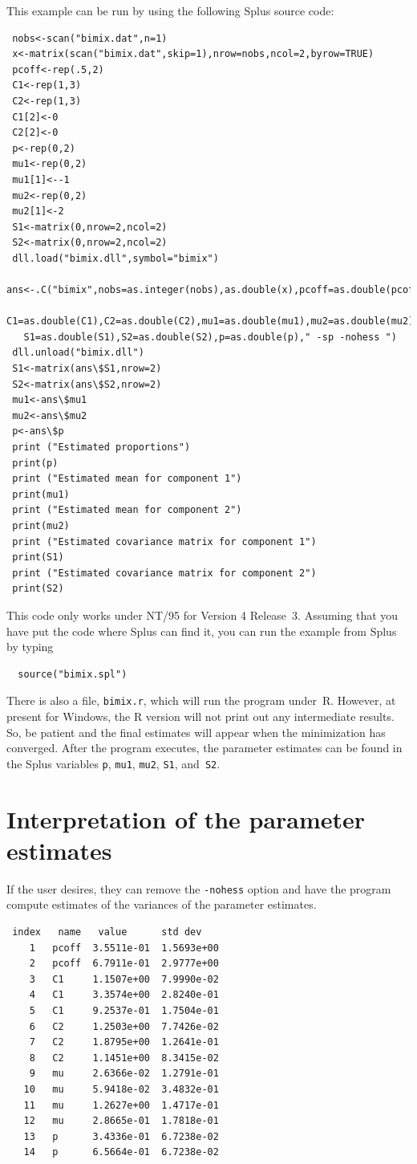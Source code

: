 This example can be run by using the following Splus source code:
\begin{lstlisting}
 nobs<-scan("bimix.dat",n=1)
 x<-matrix(scan("bimix.dat",skip=1),nrow=nobs,ncol=2,byrow=TRUE)
 pcoff<-rep(.5,2)
 C1<-rep(1,3)
 C2<-rep(1,3)
 C1[2]<-0
 C2[2]<-0
 p<-rep(0,2)
 mu1<-rep(0,2)
 mu1[1]<--1
 mu2<-rep(0,2)
 mu2[1]<-2
 S1<-matrix(0,nrow=2,ncol=2)
 S2<-matrix(0,nrow=2,ncol=2)
 dll.load("bimix.dll",symbol="bimix")
 ans<-.C("bimix",nobs=as.integer(nobs),as.double(x),pcoff=as.double(pcoff),
   C1=as.double(C1),C2=as.double(C2),mu1=as.double(mu1),mu2=as.double(mu2),
   S1=as.double(S1),S2=as.double(S2),p=as.double(p)," -sp -nohess ") 
 dll.unload("bimix.dll")
 S1<-matrix(ans\$S1,nrow=2)  
 S2<-matrix(ans\$S2,nrow=2)  
 mu1<-ans\$mu1
 mu2<-ans\$mu2
 p<-ans\$p
 print ("Estimated proportions")
 print(p)
 print ("Estimated mean for component 1")
 print(mu1)
 print ("Estimated mean for component 2")
 print(mu2)
 print ("Estimated covariance matrix for component 1")
 print(S1)
 print ("Estimated covariance matrix for component 2")
 print(S2)
\end{lstlisting}
This code  only works under NT/95 for Version 4 Release~3.
Assuming that you have put the code where Splus can find it, you can
run the example from Splus by typing
\begin{lstlisting}
  source("bimix.spl")
\end{lstlisting}
There is also a file, \texttt{bimix.r}, which will run the program under~R.
However, at present for Windows, the R version will not print out any
intermediate results.  So, be patient and the final estimates will appear
when the minimization has converged.
After the program executes, the parameter estimates can be found in
the Splus variables \texttt{p}, \texttt{mu1}, \texttt{mu2}, \texttt{S1}, and~\texttt{S2}.


\section{Interpretation of the parameter estimates}

If the user desires, they can remove the \texttt{-nohess} option and have
the program compute estimates 
of the variances of the parameter estimates. %
\begin{lstlisting}
 index   name   value      std dev   
    1   pcoff  3.5511e-01  1.5693e+00
    2   pcoff  6.7911e-01  2.9777e+00
    3   C1     1.1507e+00  7.9990e-02
    4   C1     3.3574e+00  2.8240e-01
    5   C1     9.2537e-01  1.7504e-01
    6   C2     1.2503e+00  7.7426e-02
    7   C2     1.8795e+00  1.2641e-01
    8   C2     1.1451e+00  8.3415e-02
    9   mu     2.6366e-02  1.2791e-01
   10   mu     5.9418e-02  3.4832e-01
   11   mu     1.2627e+00  1.4717e-01
   12   mu     2.8665e-01  1.7818e-01
   13   p      3.4336e-01  6.7238e-02
   14   p      6.5664e-01  6.7238e-02
\end{lstlisting}

